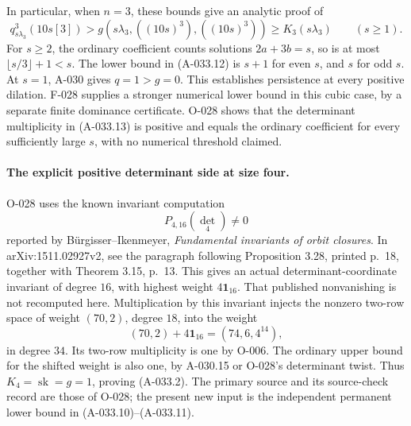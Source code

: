In particular, when \(n=3\), these bounds give an analytic
proof of
\[
        q^3_{s\lambda_3}(10s[3])
              >g(s\lambda_3,((10s)^3),((10s)^3))
              \geq K_3(s\lambda_3)
              \qquad(s\geq1).                                \tag{A-033.13}
\]
For \(s\geq2\), the ordinary coefficient counts solutions
\(2a+3b=s\), so is at most \(\lfloor s/3\rfloor+1<s\).
The lower bound in (A-033.12) is \(s+1\) for even \(s\),
and \(s\) for odd \(s\). At \(s=1\), A-030 gives \(q=1>g=0\).
This establishes persistence at every positive dilation.
F-028 supplies a stronger numerical lower bound in this
cubic case, by a separate finite dominance certificate.
O-028 shows that the determinant multiplicity in (A-033.13)
is positive and equals the ordinary coefficient for every
sufficiently large \(s\), with no numerical threshold claimed.

\paragraph{The explicit positive determinant side at size four.}
O-028 uses the known invariant computation
\[
                            P_{4,16}(\det_4)\ne0
\]
reported by B\"urgisser--Ikenmeyer,
\emph{Fundamental invariants of orbit closures}.
In arXiv:1511.02927v2, see the paragraph following Proposition 3.28,
printed p.~18, together with Theorem 3.15, p.~13.
This gives an actual determinant-coordinate invariant of degree
\(16\), with highest weight \(4\mathbf1_{16}\).
That published nonvanishing is not recomputed here.
Multiplication by this invariant injects the nonzero two-row
space of weight \((70,2)\), degree \(18\), into the weight
\[
                    (70,2)+4\mathbf1_{16}
                             =(74,6,4^{14}),
\]
in degree \(34\). Its two-row multiplicity is one by O-006.
The ordinary upper bound for the shifted weight is also one,
by A-030.15 or O-028's determinant twist.
Thus \(K_4=\operatorname{sk}=g=1\), proving (A-033.2).
The primary source and its source-check record are those of
O-028; the present new input is the independent permanent
lower bound in (A-033.10)--(A-033.11).

